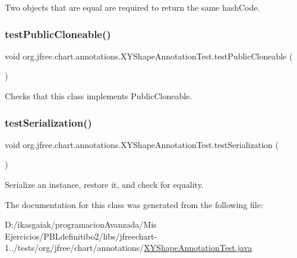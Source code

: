 Two objects that are equal are required to return the same hash\+Code. \mbox{\label{classorg_1_1jfree_1_1chart_1_1annotations_1_1_x_y_shape_annotation_test_a7a6b8eca9d66b8ebf5a325bf7377d697}} 
\subsubsection{\texorpdfstring{test\+Public\+Cloneable()}{testPublicCloneable()}}
{\footnotesize\ttfamily void org.\+jfree.\+chart.\+annotations.\+X\+Y\+Shape\+Annotation\+Test.\+test\+Public\+Cloneable (\begin{DoxyParamCaption}{ }\end{DoxyParamCaption})}

Checks that this class implements Public\+Cloneable. \mbox{\label{classorg_1_1jfree_1_1chart_1_1annotations_1_1_x_y_shape_annotation_test_ab91d2104912483cfec61448389f1f51d}} 
\subsubsection{\texorpdfstring{test\+Serialization()}{testSerialization()}}
{\footnotesize\ttfamily void org.\+jfree.\+chart.\+annotations.\+X\+Y\+Shape\+Annotation\+Test.\+test\+Serialization (\begin{DoxyParamCaption}{ }\end{DoxyParamCaption})}

Serialize an instance, restore it, and check for equality. 

The documentation for this class was generated from the following file\+:\begin{DoxyCompactItemize}
\item 
D\+:/ikasgaiak/programacion\+Avanzada/\+Mis Ejercicios/\+P\+B\+Ldefinitibo2/libs/jfreechart-\/1../tests/org/jfree/chart/annotations/\mbox{\hyperlink{_x_y_shape_annotation_test_8java}{X\+Y\+Shape\+Annotation\+Test.\+java}}\end{DoxyCompactItemize}
